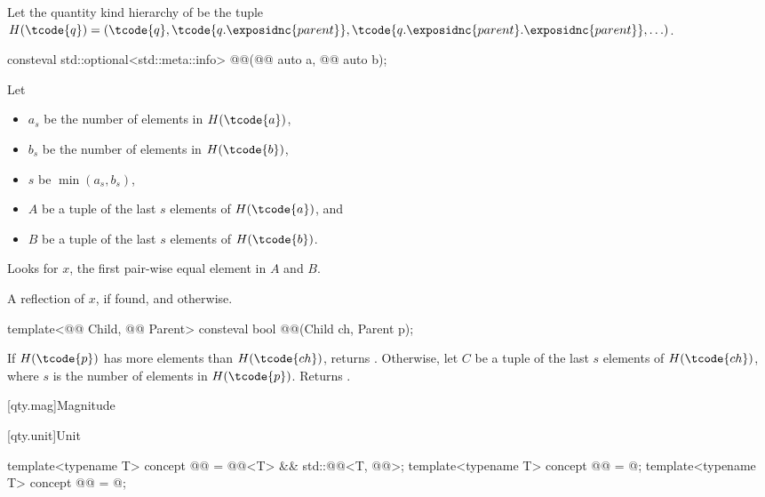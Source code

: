 \pnum
Let the quantity kind hierarchy of  be the tuple
$H(\tcode{q}) = ( \tcode{q}, \tcode{q.\exposidnc{parent}}, \tcode{q.\exposidnc{parent}.\exposidnc{parent}}, \ldots )$.

\begin{itemdecl}
consteval std::optional<std::meta::info> @@(@@ auto a,
                                                         @@ auto b);
\end{itemdecl}

\begin{itemdescr}
\pnum
Let
\begin{itemize}
\item
$a_s$ be the number of elements in $H(\tcode{a})$,
\item
$b_s$ be the number of elements in $H(\tcode{b})$,
\item
$s$ be $\operatorname{min}(a_s, b_s)$,
\item
$A$ be a tuple of the last $s$ elements of $H(\tcode{a})$, and
\item
$B$ be a tuple of the last $s$ elements of $H(\tcode{b})$.
\end{itemize}

\pnum
\effects
Looks for $x$, the first pair-wise equal element in $A$ and $B$.

\pnum
\returns
A reflection of $x$, if found, and  otherwise.
\end{itemdescr}

\begin{itemdecl}
template<@@ Child, @@ Parent>
consteval bool @@(Child ch, Parent p);
\end{itemdecl}

\begin{itemdescr}
\pnum
\returns
If $H(\tcode{p})$ has more elements than $H(\tcode{ch})$, returns .
Otherwise, let $C$ be a tuple of the last $s$ elements of $H(\tcode{ch})$,
where $s$ is the number of elements in $H(\tcode{p})$.
Returns .
\end{itemdescr}

[qty.mag]{Magnitude}

[qty.unit]{Unit}

\begin{itemdecl}
template<typename T>
concept @@ = @@<T> && std::@@<T, @@>;
template<typename T>
concept @@ = @\unspecnc@;
template<typename T>
concept @@ = @\unspecnc@;
\end{itemdecl}

